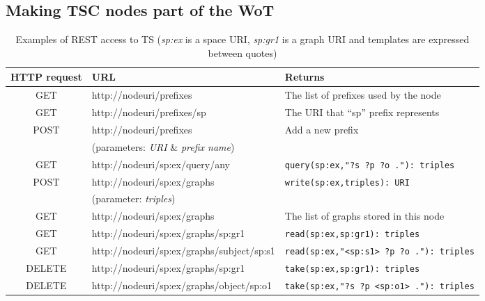 

\subsection{Making TSC nodes part of the WoT}

\begin{table*}[t!] %
\centering
\caption {Examples of REST access to TS (\textit{sp:ex} is a space URI, \textit{sp:gr1} is a graph URI and templates are expressed between quotes)}
\begin{tabular}{|c|l|l|}
\hline
HTTP request & URL & Returns \\
\hline \hline
GET & http://nodeuri/prefixes & The list of prefixes used by the node \\
GET & http://nodeuri/prefixes/sp & The URI that ``sp'' prefix represents \\
POST & http://nodeuri/prefixes & Add a new prefix \\
 & \hspace{0.5cm}(parameters: \textit{URI} \& \textit{prefix name}) & \\
GET & http://nodeuri/sp:ex/query/any & \texttt{query(sp:ex,"?s ?p ?o ."): triples} \\
POST & http://nodeuri/sp:ex/graphs & \texttt{write(sp:ex,triples): URI} \\
 & \hspace{0.5cm}(parameter: \textit{triples}) & \\
GET & http://nodeuri/sp:ex/graphs & The list of graphs stored in this node \\
GET & http://nodeuri/sp:ex/graphs/sp:gr1 & \texttt{read(sp:ex,sp:gr1): triples} \\
GET & http://nodeuri/sp:ex/graphs/subject/sp:s1 & \texttt{read(sp:ex,"<sp:s1> ?p ?o ."): triples} \\
DELETE & http://nodeuri/sp:ex/graphs/sp:gr1 & \texttt{take(sp:ex,sp:gr1): triples} \\
DELETE & http://nodeuri/sp:ex/graphs/object/sp:o1 & \texttt{take(sp:ex,"?s ?p <sp:o1> ."): triples} \\
\hline
\end{tabular}
\label{tab:WoT2TS}
\end{table*}

